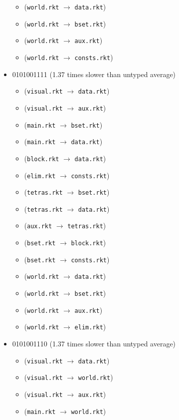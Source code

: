 \documentclass{article}
\newcommand{\mono}[1]{\texttt{#1}}
\begin{document}
\begin{itemize}
\begin{itemize}
  \item (\mono{world.rkt} $\rightarrow$ \mono{data.rkt})
  \item (\mono{world.rkt} $\rightarrow$ \mono{bset.rkt})
  \item (\mono{world.rkt} $\rightarrow$ \mono{aux.rkt})
  \item (\mono{world.rkt} $\rightarrow$ \mono{consts.rkt})
  \end{itemize}
\item 0101001111 (1.37 times slower than untyped average)
  \begin{itemize}
  \item (\mono{visual.rkt} $\rightarrow$ \mono{data.rkt})
  \item (\mono{visual.rkt} $\rightarrow$ \mono{aux.rkt})
  \item (\mono{main.rkt} $\rightarrow$ \mono{bset.rkt})
  \item (\mono{main.rkt} $\rightarrow$ \mono{data.rkt})
  \item (\mono{block.rkt} $\rightarrow$ \mono{data.rkt})
  \item (\mono{elim.rkt} $\rightarrow$ \mono{consts.rkt})
  \item (\mono{tetras.rkt} $\rightarrow$ \mono{bset.rkt})
  \item (\mono{tetras.rkt} $\rightarrow$ \mono{data.rkt})
  \item (\mono{aux.rkt} $\rightarrow$ \mono{tetras.rkt})
  \item (\mono{bset.rkt} $\rightarrow$ \mono{block.rkt})
  \item (\mono{bset.rkt} $\rightarrow$ \mono{consts.rkt})
  \item (\mono{world.rkt} $\rightarrow$ \mono{data.rkt})
  \item (\mono{world.rkt} $\rightarrow$ \mono{bset.rkt})
  \item (\mono{world.rkt} $\rightarrow$ \mono{aux.rkt})
  \item (\mono{world.rkt} $\rightarrow$ \mono{elim.rkt})
  \end{itemize}
\item 0101001110 (1.37 times slower than untyped average)
  \begin{itemize}
  \item (\mono{visual.rkt} $\rightarrow$ \mono{data.rkt})
  \item (\mono{visual.rkt} $\rightarrow$ \mono{world.rkt})
  \item (\mono{visual.rkt} $\rightarrow$ \mono{aux.rkt})
  \item (\mono{main.rkt} $\rightarrow$ \mono{world.rkt})

\end{itemize}
\end{itemize}
\end{document}
